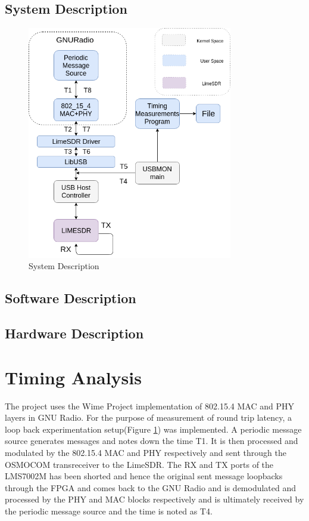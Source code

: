 \subsection{System Description}

\begin{figure}[h!]
\centering
\includegraphics[width=0.8\textwidth]{Figure/Setup2.png}
\caption{System Description}
\label{setup_overview}
\end{figure}

\subsection{Software Description}
\subsection{Hardware Description}
\section{Timing Analysis}

The project uses the Wime Project implementation of 802.15.4 MAC and PHY layers in GNU Radio. For the purpose of measurement of round trip latency, a loop back experimentation setup(Figure \ref{setup_overview}) was implemented. A periodic message source generates messages and notes down the time T1. It is then processed and modulated by the 802.15.4 MAC and PHY respectively and sent through the OSMOCOM transreceiver to the LimeSDR. The RX and TX ports of the LMS7002M has been shorted and hence the original sent message loopbacks through the FPGA and comes back to the GNU Radio and is demodulated and processed by the PHY and MAC blocks respectively and is ultimately received by the periodic message source and the time is noted as T4.

